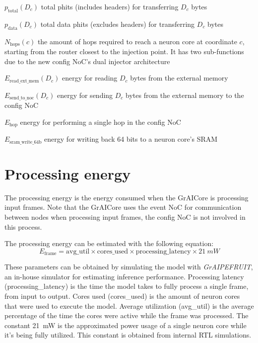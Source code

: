 \begin{eqexpl}[15mm]
    \item{$p_{\textrm{total}}(D_c)$} total phits (includes headers) for transferring $D_c$ bytes
    \item{$p_{\textrm{data}}(D_c)$} total data phits (excludes headers) for transferring $D_c$ bytes
    \item{$N_{\textrm{hops}}(c)$} the amount of hops required to reach a neuron core at coordinate $c$, starting from the router closest to the injection point. It has two sub-functions due to the new config NoC's dual injector architecture
    \item{$E_{\textrm{read\_ext\_mem}}(D_c)$} energy for reading $D_c$ bytes from the external memory
    \item{$E_{\textrm{send\_to\_noc}}(D_c)$} energy for sending $D_c$ bytes from the external memory to the config NoC
    \item{$E_{\textrm{hop}}$} energy for performing a single hop in the config NoC
    \item{$E_{\textrm{sram\_write\_64b}}$} energy for writing back 64 bits to a neuron core's SRAM
\end{eqexpl}

\section{Processing energy}
The processing energy is the energy consumed when the GrAICore is processing input frames.
Note that the GrAICore uses the event NoC for communication between nodes when processing input frames, the config NoC is not involved in this process.

The processing energy can be estimated with the following equation:
\begin{equation}
    E_{\textrm{frame}} = \textrm{avg\_util} \times \textrm{cores\_used} \times \textrm{processing\_latency} \times \SI{21}{mW}
\end{equation}

These parameters can be obtained by simulating the model with \textit{GrAIPEFRUIT}, an in-house simulator for estimating inference performance.
Processing latency (\textrm{processing\_latency}) is the time the model takes to fully process a single frame, from input to output.
Cores used (\textrm{cores\_used}) is the amount of neuron cores that were used to execute the model.
Average utilization (\textrm{avg\_util}) is the average percentage of the time the cores were active while the frame was processed. 
The constant \SI{21}{mW} is the approximated power usage of a single neuron core while it's being fully utilized.
This constant is obtained from internal RTL simulations.

